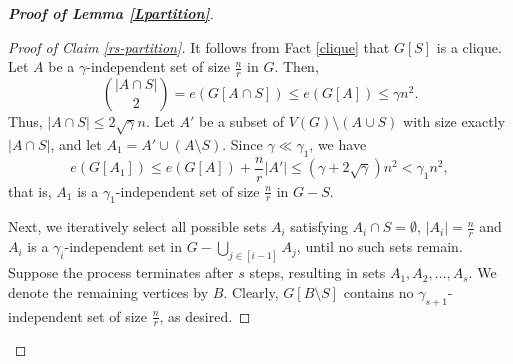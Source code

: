 \documentclass[11pt, a4paper]{article}
\theoremstyle{definition}
\newcommand{\<}{\subseteq}
\begin{document}
\begin{proof}[\bf Proof of Lemma \ref{Lpartition}]
\begin{proof}[Proof of Claim \ref{rs-partition}]
It follows from Fact \ref{clique} that $G[S]$ is a clique. Let $A$ be a $\gamma$-independent set of size $\frac{n}{r}$ in $G$. Then, 
$$\binom{|A\cap S|}{2}=e(G[A\cap S])\le e(G[A])\le \gamma n^2.$$
Thus, $|A\cap S|\le 2\sqrt{\gamma}n$. Let $A'$ be a subset of $V(G)\setminus (A\cup S)$ with size exactly $|A\cap S|$, and let $A_1=A'\cup (A\setminus S)$.  %
Since $\gamma \ll \gamma_1$, we have 
$$e(G[A_1])\le e(G[A])+\frac{n}{r}|A'|\le (\gamma+2\sqrt{\gamma})n^2<\gamma_1 n^2,$$
that is, $A_1$ is a $\gamma_1$-independent set of size $\frac{n}{r}$ in $G-S$. 

Next, we iteratively select all possible sets $A_i$ satisfying $A_i\cap S=\emptyset$, $|A_i|=\frac{n}{r}$ and $A_i$ is a $\gamma_i$-independent set in $G-\bigcup_{j\in [i-1]}A_j$, until no such sets remain. Suppose the process terminates after $s$ steps, resulting in sets $A_1,A_2,\ldots,A_s$. We denote the remaining vertices by $B$. Clearly, $G[B\setminus S]$ contains no $\gamma_{s+1}$-independent set of size $\frac{n}{r}$, as desired. 
\end{proof}








\end{proof}
\end{document}
